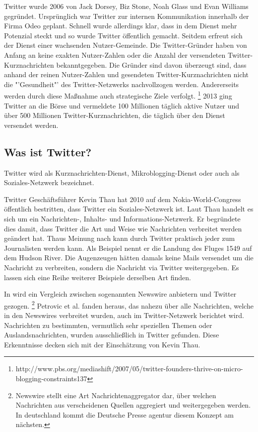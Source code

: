			Twitter wurde 2006 von Jack Dorsey, Biz Stone, Noah Glass und Evan Williams gegründet.
			Ursprünglich war Twitter zur internen Kommunikation innerhalb der Firma Odeo geplant.
			Schnell wurde allerdings klar, dass in dem Dienst mehr Potenzial steckt und so wurde Twitter öffentlich gemacht.
			Seitdem erfreut sich der Dienst einer wachsenden Nutzer-Gemeinde.
			Die Twitter-Gründer haben von Anfang an keine exakten Nutzer-Zahlen oder die Anzahl der versendeten Twitter-Kurznachrichten bekanntgegeben.
			Die Gründer sind davon überzeugt sind, dass anhand der reinen Nutzer-Zahlen und gesendeten Twitter-Kurznachrichten nicht die "'Gesundheit"' des Twitter-Netzwerks nachvollzogen werden.
			Andererseits werden durch diese Maßnahme auch strategische Ziele verfolgt.  \footnote{http://www.pbs.org/mediashift/2007/05/twitter-founders-thrive-on-micro-blogging-constraints137}
			2013 ging Twitter an die Börse und vermeldete 100 Millionen täglich aktive Nutzer und über 500 Millionen Twitter-Kurznachrichten, die täglich über den Dienst versendet werden. 

		\subsection{Was ist Twitter?}
		
			Twitter wird als Kurznachrichten-Dienst, Mikroblogging-Dienst oder auch als Soziales-Netzwerk bezeichnet. 

			Twitter Geschäftsführer Kevin Thau hat 2010 auf dem Nokia-World-Congress öffentlich bestritten, dass Twitter ein Soziales-Netzwerk ist. 
			Laut Thau handelt es sich um ein Nachrichten-, Inhalts- und Informations-Netzwerk. 
			Er begründete dies damit, dass Twitter die Art und Weise wie Nachrichten verbreitet werden geändert hat.
			Thaus Meinung nach kann durch Twitter praktisch jeder zum Journalisten werden kann. 
			Als Beispiel nennt er die Landung des Fluges 1549 auf dem Hudson River. 
			Die Augenzeugen hätten damals keine Mails versendet um die Nachricht zu verbreiten, sondern die Nachricht via Twitter weitergegeben.
			Es lassen sich eine Reihe weiterer Beispiele derselben Art finden. 

			In \cite{Petrovic2013} wird ein Vergleich zwischen sogenannten Newswire anbietern und Twitter gezogen. \footnote{Newswire stellt eine Art Nachrichtenaggregator dar, über welchen Nachrichten aus verscheidenen Quellen aggregiert und weitergegeben werden. In deutschland kommt die Deutsche Presse agentur diesem Konzept am nächsten.}
			Petrovic et al. fanden heraus, das nahezu über alle Nachrichten, welche in den Newswires verbreitet wurden, auch im Twitter-Netzwerk berichtet wird.
			Nachrichten zu bestimmten, vermutlich sehr speziellen Themen oder Auslandsnachrichten, wurden ausschließlich in Twitter gefunden. 
			Diese Erkenntnisse decken sich mit der Einschätzung von Kevin Thau.

